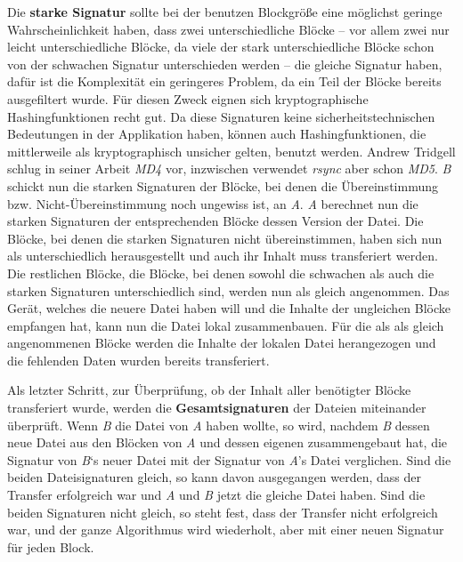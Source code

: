 Die \textbf{starke Signatur} sollte bei der benutzen Blockgröße eine möglichst geringe Wahrscheinlichkeit haben, dass zwei unterschiedliche Blöcke
-- vor allem zwei nur leicht unterschiedliche Blöcke, da viele der stark unterschiedliche Blöcke schon von der schwachen Signatur unterschieden werden -- die
gleiche Signatur haben, dafür ist die Komplexität ein geringeres Problem, da ein Teil der Blöcke bereits ausgefiltert wurde. Für diesen Zweck eignen sich 
kryptographische Hashingfunktionen recht gut. Da diese Signaturen keine sicherheitstechnischen Bedeutungen in der Applikation haben, können auch 
Hashingfunktionen, die mittlerweile als kryptographisch unsicher gelten, benutzt werden. Andrew Tridgell schlug in seiner Arbeit \textit{MD4} 
vor\cite{Tridgell99}, inzwischen verwendet \textit{rsync} aber schon \textit{MD5}\cite{rsync}\cite{wiki_rsync}. 
\emph{B} schickt nun die starken Signaturen der Blöcke, bei denen die Übereinstimmung bzw. Nicht-Übereinstimmung noch ungewiss ist, an \emph{A}. 
\emph{A} berechnet nun die starken Signaturen der entsprechenden Blöcke dessen Version der Datei. Die Blöcke, bei denen die starken Signaturen nicht 
übereinstimmen, haben sich nun als unterschiedlich herausgestellt und auch ihr Inhalt muss transferiert werden. Die restlichen Blöcke, die Blöcke, 
bei denen sowohl die schwachen als auch die starken Signaturen unterschiedlich sind, werden nun als gleich angenommen.
Das Gerät, welches die neuere Datei haben will und die Inhalte der ungleichen Blöcke empfangen hat, kann nun die Datei lokal zusammenbauen.
Für die als als gleich angenommenen Blöcke werden die Inhalte der lokalen Datei herangezogen und die fehlenden Daten wurden bereits transferiert.

Als letzter Schritt, zur Überprüfung, ob der Inhalt aller benötigter Blöcke transferiert wurde, werden die \textbf{Gesamtsignaturen} der Dateien miteinander
überprüft. Wenn \emph{B} die Datei von \emph{A} haben wollte, so wird, nachdem \emph{B} dessen neue Datei aus den Blöcken von \emph{A} und dessen eigenen
zusammengebaut hat, die Signatur von \emph{B}`s neuer Datei mit der Signatur von \emph{A}'s Datei verglichen. Sind die beiden Dateisignaturen gleich, so
kann davon ausgegangen werden, dass der Transfer erfolgreich war und \emph{A} und \emph{B} jetzt die gleiche Datei haben. Sind die beiden Signaturen
nicht gleich, so steht fest, dass der Transfer nicht erfolgreich war, und der ganze Algorithmus wird wiederholt, aber mit einer neuen Signatur für
jeden Block\cite{Tridgell99}.
\\

